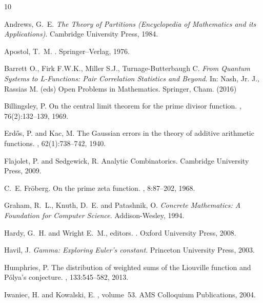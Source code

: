 \documentclass[10pt,reqno,letterpaper]{article}
\theoremstyle{plain}
\numberwithin{theorem}{section}
\theoremstyle{definition}
\newcounter{completeBibitemIncrementCtr}
\renewenvironment{thebibliography}[1]{
     \renewcommand{\refname}{} 
     
     \begin{oldthebibliography}{#1}
     \setlength{\itemsep}{-0.6mm}
     \setlength{\parskip}{0em}
     \setlength{\topsep}{0pt}
     \setlength{\partopsep}{0pt}
     \setcounter{enumiv}{\value{completeBibitemIncrementCtr}}
     \normalsize%
}
{
     \setcounter{completeBibitemIncrementCtr}{\value{enumiv}}
     \end{oldthebibliography}
}
\begin{document}
\vskip -4mm
\begin{thebibliography}{10}

Andrews, G.~E. \emph{The Theory of Partitions (Encyclopedia of Mathematics and its Applications)}. 
Cambridge University Press, 1984.

Apostol, T.~M.
.
\newblock Springer--Verlag, 1976.

Barrett O., Firk F.W.K., Miller S.J., Turnage-Butterbaugh C. 
\emph{From Quantum Systems to L-Functions: Pair Correlation Statistics and Beyond}. 
In: Nash, Jr. J., Rassias M. (eds) Open Problems in Mathematics. Springer, Cham. (2016) 

Billingsley, P.
\newblock On the central limit theorem for the prime divisor function.
, 76(2):132--139, 1969.

Erd{\H{o}}s, P. and Kac, M.
\newblock The Gaussian errors in the theory of additive arithmetic functions.
, 62(1):738--742, 1940.

Flajolet, P. and Sedgewick, R. Analytic Combinatorics. Cambridge University Press, 2009.

C.~E. Fr{\"{o}}berg.
\newblock On the prime zeta function.
, 8:87--202, 1968.

Graham, R.~L., Knuth, D.~E. and Patashnik, O. 
\emph{Concrete Mathematics: A Foundation for Computer Science}. Addison-Wesley, 1994.

Hardy, G.~H. and Wright E.~M., editors.
.
\newblock Oxford University Press, 2008.

Havil, J.  \emph{Gamma: Exploring Euler's constant}. Princeton University Press, 2003. 

Humphries, P.
\newblock The distribution of weighted sums of the {L}iouville function and
  {P}\'{o}lya's conjecture.
, 133:545--582, 2013.

Iwaniec, H. and Kowalski, E.
, volume~53.
\newblock AMS Colloquium Publications, 2004.


\end{thebibliography}
\end{document}
